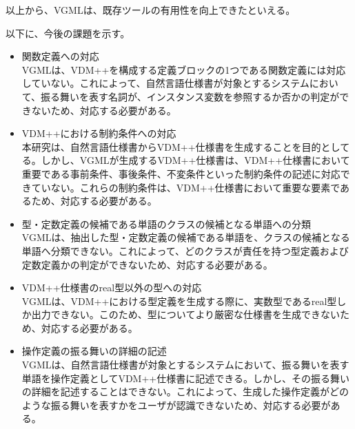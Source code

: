以上から、VGMLは、既存ツールの有用性を向上できたといえる。

以下に、今後の課題を示す。

\begin{itemize}
	\item 関数定義への対応\\VGMLは、VDM++を構成する定義ブロックの1つである関数定義には対応していない。これによって、自然言語仕様書が対象とするシステムにおいて、振る舞いを表す名詞が、インスタンス変数を参照するか否かの判定ができないため、対応する必要がある。
	\item VDM++における制約条件への対応\\本研究は、自然言語仕様書からVDM++仕様書を生成することを目的としてる。しかし、VGMLが生成するVDM++仕様書は、VDM++仕様書において重要である事前条件、事後条件、不変条件といった制約条件の記述に対応できていない。これらの制約条件は、VDM++仕様書において重要な要素であるため、対応する必要がある。
	\item 型・定数定義の候補である単語のクラスの候補となる単語への分類\\VGMLは、抽出した型・定数定義の候補である単語を、クラスの候補となる単語へ分類できない。これによって、どのクラスが責任を持つ型定義および定数定義かの判定ができないため、対応する必要がある。
	\item VDM++仕様書のreal型以外の型への対応\\VGMLは、VDM++における型定義を生成する際に、実数型であるreal型しか出力できない。このため、型についてより厳密な仕様書を生成できないため、対応する必要がある。
	\item 操作定義の振る舞いの詳細の記述\\VGMLは、自然言語仕様書が対象とするシステムにおいて、振る舞いを表す単語を操作定義としてVDM++仕様書に記述できる。しかし、その振る舞いの詳細を記述することはできない。これによって、生成した操作定義がどのような振る舞いを表すかをユーザが認識できないため、対応する必要がある。
\end{itemize}

